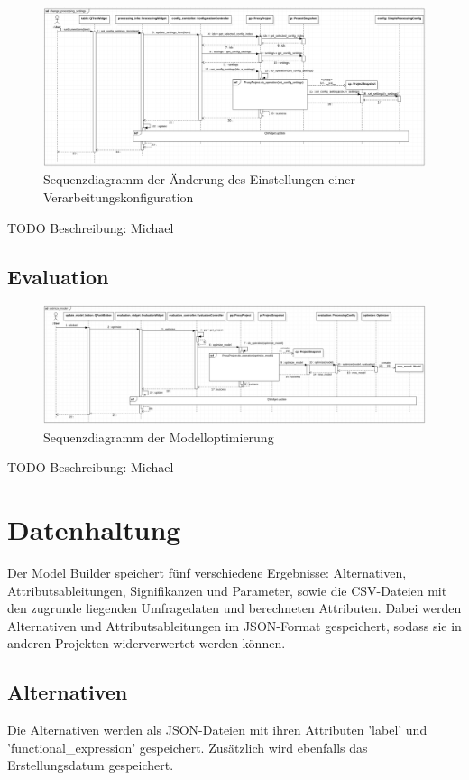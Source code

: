 \documentclass{article}
\begin{document}
\begin{itemize}
\begin{figure}[H]%
    \centering
    \includegraphics[width=13cm]{entwurf/Entwurf_dokument/img/Michael/sd_change_processing_settings.png}
    \caption{Sequenzdiagramm der Änderung des Einstellungen einer Verarbeitungskonfiguration}
\end{figure}
TODO Beschreibung: Michael


\subsection{Evaluation}

\begin{figure}[H]%
    \centering
    \includegraphics[width=13cm]{entwurf/Entwurf_dokument/img/Michael/sd_optimize_model.png}
    \caption{Sequenzdiagramm der Modelloptimierung}
\end{figure}
TODO Beschreibung: Michael

\section{Datenhaltung}

Der Model Builder speichert fünf verschiedene Ergebnisse: Alternativen, Attributsableitungen, Signifikanzen und Parameter, sowie die CSV-Dateien mit den zugrunde liegenden Umfragedaten und berechneten Attributen. Dabei werden Alternativen und Attributsableitungen im JSON-Format gespeichert, sodass sie in anderen Projekten widerverwertet werden können.

\subsection{Alternativen}
Die Alternativen werden als JSON-Dateien mit ihren Attributen 'label' und 'functional\_expression' gespeichert. Zusätzlich wird ebenfalls das Erstellungsdatum gespeichert.


\end{itemize}
\end{document}
